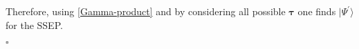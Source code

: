 \documentclass[10pt]{article}
\numberwithin{equation}{section}
\numberwithin{equation}{subsection}
\begin{document}
Therefore, using \eqref{Gamma-product} and by considering all possible $\bm{\tau}$ one finds $|\Psi^{'}\rangle$ for the SSEP.
\begin{flushright}
	$\square$
\end{flushright}
\begin{comment}
\subsection{Explicit formula for the steady state $|\Psi\rangle$}
{\color{blue}can we proceed as above? using sth similar to \eqref{goodTP-S2}}

The steady state $|\Psi\rangle$ of the Hamiltonian $H$ is given by 
\begin{equation}\label{steadyStateH}
	|\Psi\rangle=\sum_{\tau_{1},\ldots,\tau_{L}=1}^{N}\Psi(\bm{\tau})|\bm{\tau}\rangle
\end{equation}
where for every $(\tau_{1},\ldots,\tau_{L})=\bm{\tau}$

 Using \eqref{ABS} it is possible to write $\Psi(\bm{\tau})$ explicitly, however to compute correlations it is enough the above expression. We report the explicit formula and the proof in Appendix \ref{appB}.\\
\\
The state $|\Psi\rangle$ is normalized. To prove it we aim to show that 
\end{comment}
\end{document}
